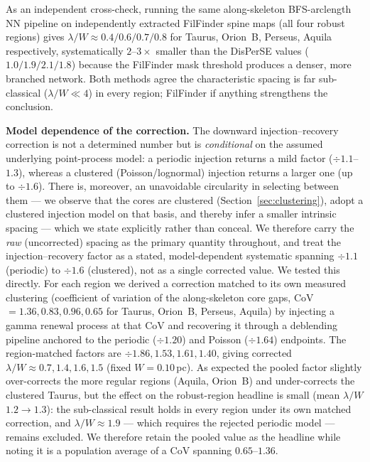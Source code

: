 \documentclass[usenatbib,twoside,twocolumn]{mnras}
\begin{document}
As an independent cross-check, running the same along-skeleton BFS-arclength NN pipeline on independently extracted FilFinder spine maps (all four robust regions) gives $\lambda/W\approx0.4/0.6/0.7/0.8$ for Taurus, Orion~B, Perseus, Aquila respectively, systematically $2$--$3\times$ smaller than the DisPerSE values ($1.0/1.9/2.1/1.8$) because the FilFinder mask threshold produces a denser, more branched network. Both methods agree the characteristic spacing is far sub-classical ($\lambda/W\ll4$) in every region; FilFinder if anything strengthens the conclusion.

\smallskip\noindent\textbf{Model dependence of the correction.}\label{sec:injection_recovery_model}
The downward injection--recovery correction is not a determined number but is \emph{conditional} on the assumed underlying point-process model: a periodic injection returns a mild factor ($\div1.1$--$1.3$), whereas a clustered (Poisson/lognormal) injection returns a larger one (up to $\div1.6$). There is, moreover, an unavoidable circularity in selecting between them --- we observe that the cores are clustered (Section~\ref{sec:clustering}), adopt a clustered injection model on that basis, and thereby infer a smaller intrinsic spacing --- which we state explicitly rather than conceal. We therefore carry the \emph{raw} (uncorrected) spacing as the primary quantity throughout, and treat the injection--recovery factor as a stated, model-dependent systematic spanning $\div1.1$ (periodic) to $\div1.6$ (clustered), not as a single corrected value. We tested this directly. For each region we derived a correction matched to its own measured clustering (coefficient of variation of the along-skeleton core gaps, CoV$=1.36,0.83,0.96,0.65$ for Taurus, Orion~B, Perseus, Aquila) by injecting a gamma renewal process at that CoV and recovering it through a deblending pipeline anchored to the periodic ($\div1.20$) and Poisson ($\div1.64$) endpoints. The region-matched factors are $\div1.86,1.53,1.61,1.40$, giving corrected $\lambda/W\approx0.7,1.4,1.6,1.5$ (fixed $W=0.10$\,pc). As expected the pooled factor slightly over-corrects the more regular regions (Aquila, Orion~B) and under-corrects the clustered Taurus, but the effect on the robust-region headline is small (mean $\lambda/W$ $1.2\to1.3$): the sub-classical result holds in every region under its own matched correction, and $\lambda/W\approx1.9$ --- which requires the rejected periodic model --- remains excluded. We therefore retain the pooled value as the headline while noting it is a population average of a CoV spanning $0.65$--$1.36$.
\end{document}
